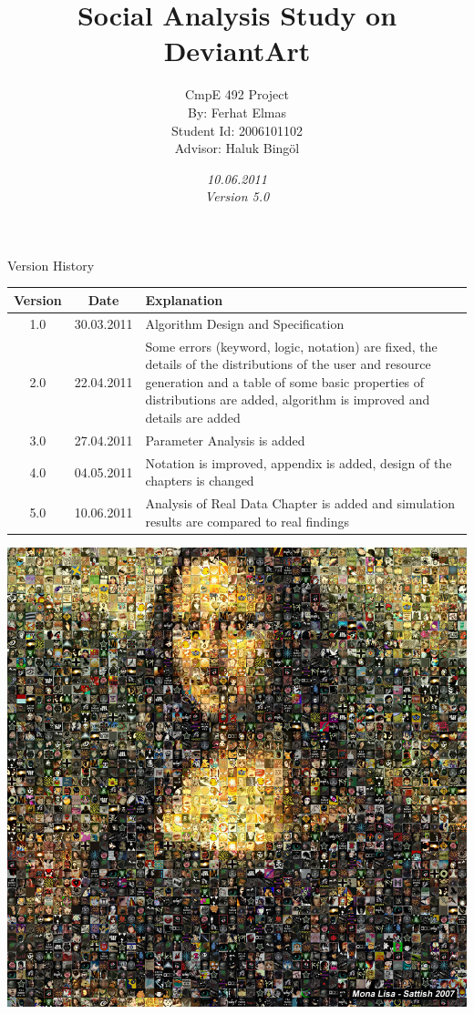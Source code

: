 \documentclass[12pt,a4paper]{report}
\title{Social Analysis Study on DeviantArt}
\date{\emph{10.06.2011} \\ \emph{Version 5.0} }
\author{CmpE 492 Project\\
	By: Ferhat Elmas \\
	Student Id: 2006101102\\
	Advisor: Haluk Bing\"{o}l
}
\begin{document}


\maketitle

\begin{table}[htdp]
\begin{center}
\textup{\Huge Version History}
\begin{tabular}{|c|c|p{10cm}|}
\hline
\textbf{Version} & \textbf{Date} & \textbf{Explanation} \\
\hline
1.0 & 30.03.2011 & Algorithm Design and Specification \\
\hline
2.0& 22.04.2011 & Some errors (keyword, logic, notation) are fixed, the details of the distributions of the user and resource generation and a table of some basic properties of distributions are added, algorithm is improved and details are added\\
\hline
3.0& 27.04.2011& Parameter Analysis is added\\
\hline
4.0& 04.05.2011& Notation is improved, appendix is added, design of the chapters is changed\\
\hline
5.0& 10.06.2011& Analysis of Real Data Chapter is added and simulation results are compared to real findings\\
\hline
\end{tabular}
\end{center}
\end{table}

\clearpage

\hspace{-3.7cm}\includegraphics[width=200mm]{intro_monalisa.jpg}
\end{document}

